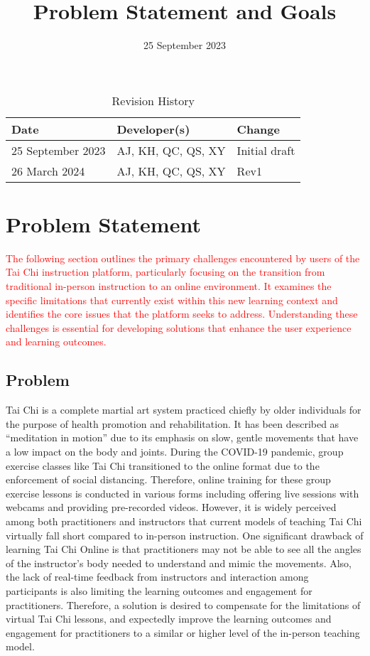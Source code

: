 \documentclass{article}
\title{Problem Statement and Goals\\\progname}
\author{\authname}
\date{25 September 2023}
\begin{document}
\maketitle

\begin{table}[hp]
  \caption{Revision History} \label{TblRevisionHistory}
  \begin{tabularx}{\textwidth}{llX}
    \toprule
    \textbf{Date} & \textbf{Developer(s)} & \textbf{Change}\\
    \midrule
    25 September 2023 & AJ, KH, QC, QS, XY & Initial draft \\
    \midrule
    26 March 2024 & AJ, KH, QC, QS, XY & Rev1 \\
    \bottomrule
  \end{tabularx}
\end{table}

\section{Problem Statement}
\textcolor{red}{The following section outlines the primary challenges 
encountered by users of the Tai Chi instruction platform, particularly 
focusing on the transition from traditional in-person instruction to an online 
environment. It examines the specific limitations that currently exist within 
this new learning context and identifies the core issues that the platform seeks 
to address. Understanding these challenges is essential for developing solutions 
that enhance the user experience and learning outcomes.}

\subsection{Problem}

Tai Chi is a complete martial art system practiced chiefly by older individuals
for the purpose of health promotion and rehabilitation. It has been described as
“meditation in motion” due to its emphasis on slow, gentle movements that have a
low impact on the body and joints. During the COVID-19 pandemic, group exercise
classes like Tai Chi transitioned to the online format due to the enforcement of
social distancing. Therefore, online training for these group exercise lessons
is conducted in various forms including offering live sessions with webcams and
providing pre-recorded videos. However, it is widely perceived among both
practitioners and instructors that current models of teaching Tai Chi virtually
fall short compared to in-person instruction. One significant drawback of
learning Tai Chi Online is that practitioners may not be able to see all the
angles of the instructor’s body needed to understand and mimic the movements.
Also, the lack of real-time feedback from instructors and interaction among
participants is also limiting the learning outcomes and engagement for
practitioners. Therefore, a solution is desired to compensate for the
limitations of virtual Tai Chi lessons, and expectedly improve the learning
outcomes and engagement for practitioners to a similar or higher level of the
in-person teaching model.
\end{document}
